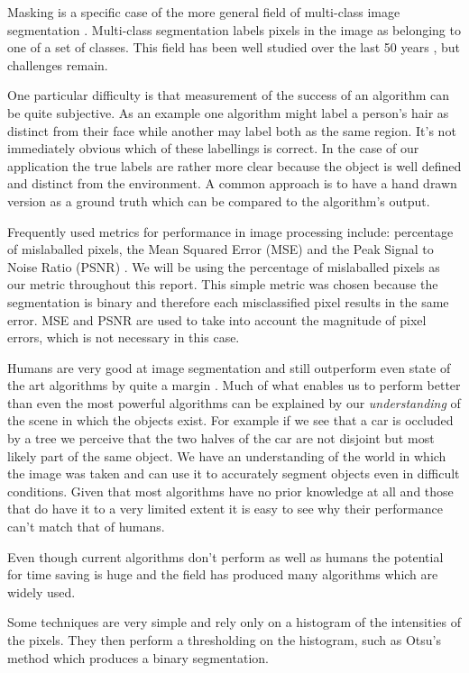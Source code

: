 \documentclass[12pt]{IIBproject}
\begin{document}
Masking is a specific case of the more general field of multi-class image segmentation \cite{pal1993review}. Multi-class segmentation labels pixels in the image as belonging to one of a set of classes. This field has been well studied over the last 50 years \cite{wang2008image}, but challenges remain. 

One particular difficulty is that measurement of the success of an algorithm can be quite subjective. As an example one algorithm might label a person's hair as distinct from their face while another may label both as the same region. It's not immediately obvious which of these labellings is correct. In the case of our application the true labels are rather more clear because the object is well defined and distinct from the environment. A common approach is to have a hand drawn version as a ground truth which can be compared to the algorithm's output. 

Frequently used metrics for performance in image processing include: percentage of mislaballed pixels, the Mean Squared Error (MSE) and the Peak Signal to Noise Ratio (PSNR) \cite{ponomarenko2009metrics}. We will be using the percentage of mislaballed pixels as our metric throughout this report. This simple metric was chosen because the segmentation is binary and therefore each misclassified pixel results in the same error. MSE and PSNR are used to take into account the magnitude of pixel errors, which is not necessary in this case.

Humans are very good at image segmentation and still outperform even state of the art algorithms by quite a margin \cite{guraripull}. Much of what enables us to perform better than even the most powerful algorithms can be explained by our \emph{understanding} of the scene in which the objects exist. For example if we see that a car is occluded by a tree we perceive that the two halves of the car are not disjoint but most likely part of the same object. We have an understanding of the world in which the image was taken and can use it to accurately segment objects even in difficult conditions. Given that most algorithms have no prior knowledge at all and those that do have it to a very limited extent it is easy to see why their performance can't match that of humans.

Even though current algorithms don't perform as well as humans the potential for time saving is huge and the field has produced many algorithms which are widely used. 

Some techniques are very simple and rely only on a histogram of the intensities of the pixels. They then perform a thresholding on the histogram, such as Otsu's method \cite{otsu1975threshold} which produces a binary segmentation. 
\end{document}
